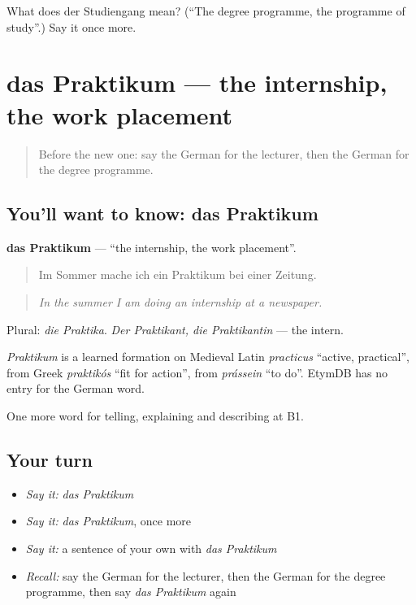 \begin{tcolorbox}[breakable,colback=teal!4,colframe=teal!35!black,title={Before you move on}]
What does der Studiengang mean? (\textquotedblleft{}The degree programme, the programme of study\textquotedblright{}.) Say it once more.
\end{tcolorbox}
\section[das Praktikum]{das Praktikum — the internship, the work placement}

\label{lesson:GE-C377-praktikum}



\begin{quote}
Before the new one: say the German for the lecturer, then the German for the degree programme.
\end{quote}

\subsection*{You'll want to know: das Praktikum}
\textbf{das Praktikum} — \textquotedblleft{}the internship, the work placement\textquotedblright{}.

\begin{quote}
Im Sommer mache ich ein Praktikum bei einer Zeitung.
\end{quote}

\begin{quote}
\emph{In the summer I am doing an internship at a newspaper.}
\end{quote}

Plural: \emph{die Praktika}. \emph{Der Praktikant, die Praktikantin} — the intern.

\begin{cousinweb}
\emph{Praktikum} is a learned formation on Medieval Latin \emph{practicus} \textquotedblleft{}active, practical\textquotedblright{}, from Greek \emph{praktikós} \textquotedblleft{}fit for action\textquotedblright{}, from \emph{prássein} \textquotedblleft{}to do\textquotedblright{}. EtymDB has no entry for the German word.
\end{cousinweb}

\begin{grammarlens}[title={What you've built}]
One more word for telling, explaining and describing at B1.
\end{grammarlens}

\subsection*{Your turn}
\begin{itemize}
\raggedright
  \item \emph{Say it:} \emph{das Praktikum}
  \item \emph{Say it:} \emph{das Praktikum}, once more
  \item \emph{Say it:} a sentence of your own with \emph{das Praktikum}
  \item \emph{Recall:} say the German for the lecturer, then the German for the degree programme, then say \emph{das Praktikum} again
\end{itemize}

